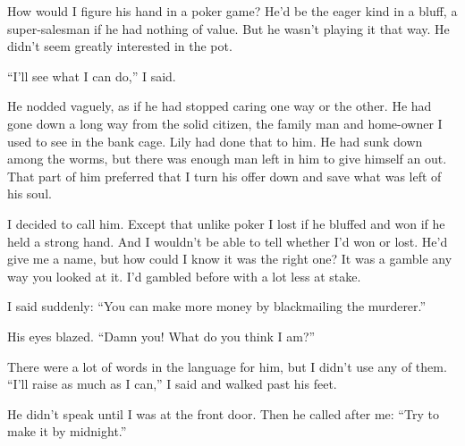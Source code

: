 \documentclass{novel}
\begin{document}
{How would I figure his hand in a poker game? He’d be the eager kind in a bluff, a super-salesman if he had nothing of value. But he wasn’t playing it that way. He didn’t seem greatly interested in the pot.

“I’ll see what I can do,” I said.

He nodded vaguely, as if he had stopped caring one way or the other. He had gone down a long way from the solid citizen, the family man and home-owner I used to see in the bank cage. Lily had done that to him. He had sunk down among the worms, but there was enough man left in him to give himself an out. That part of him preferred that I turn his offer down and save what was left of his soul.

I decided to call him. Except that unlike poker I lost if he bluffed and won if he held a strong hand. And I wouldn’t be able to tell whether I’d won or lost. He’d give me a name, but how could I know it was the right one? It was a gamble any way you looked at it. I’d gambled before with a lot less at stake.

I said suddenly: “You can make more money by blackmailing the murderer.”

His eyes blazed. “Damn you! What do you think I am?”

There were a lot of words in the language for him, but I didn’t use any of them. “I’ll raise as much as I can,” I said and walked past his feet.

He didn’t speak until I was at the front door. Then he called after me: “Try to make it by midnight.”

}

\vspace{2\nbs}
\clearpage
\thispagestyle{empty}
\end{document}
